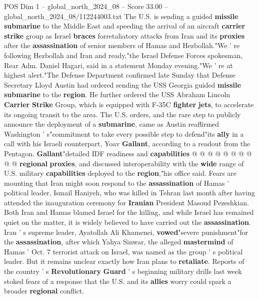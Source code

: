 \begin{textsample}{POS Dim 1 – global\_north\_2024\_08 – Score 33.00 – global\_north\_2024\_08/112244003.txt}  \label{ex:f1_pos_071}
The U.S. is sending a guided \textbf{missile} \textbf{submarine} to the Middle East and speeding the arrival of an aircraft \textbf{carrier} \textbf{strike} group as Israel \textbf{braces} forretaliatory attacks from Iran and its \textbf{proxies} after the \textbf{assassination} of senior members of Hamas and Hezbollah."We ' re following Hezbollah and Iran and ready,"the Israel Defense Forces spokesman, Rear Adm.
Daniel Hagari, said in a statement Monday evening."We ' re at highest alert."The Defense Department confirmed late Sunday that Defense Secretary Lloyd Austin had ordered sending the USS Georgia guided \textbf{missile} \textbf{submarine} to the \textbf{region}.
He further ordered the USS Abraham Lincoln \textbf{Carrier} \textbf{Strike} Group, which is equipped with F-35C \textbf{fighter} \textbf{jets}, to accelerate its ongoing transit to the area.
The U.S. orders, and the rare step to publicly announce the deployment of a \textbf{submarine}, came as Austin reaffirmed Washington ' s"commitment to take every possible step to defend"its \textbf{ally} in a call with his Israeli counterpart, Yoav \textbf{Gallant}, according to a readout from the Pentagon. \textbf{Gallant}"detailed IDF readiness and \textbf{capabilities} @ @ @ @ @ @ @ @ @ @ \textbf{regional} \textbf{proxies}, and discussed interoperability with the \textbf{wide} range of U.S. military \textbf{capabilities} deployed to the \textbf{region},"his office said.
Fears are mounting that Iran might soon respond to the \textbf{assassination} of Hamas ' political leader, Ismail Haniyeh, who was killed in Tehran last month after having attended the inauguration ceremony for \textbf{Iranian} President Masoud Pezeshkian.
Both Iran and Hamas blamed Israel for the killing, and while Israel has remained quiet on the matter, it is widely believed to have carried out the \textbf{assassination}.
Iran ' s supreme leader, Ayatollah Ali Khamenei, \textbf{vowed}"severe punishment"for the \textbf{assassination}, after which Yahya Sinwar, the alleged \textbf{mastermind} of Hamas ' Oct. 7 terrorist attack on Israel, was named as the group ' s political leader.
But it remains unclear exactly how Iran plans to \textbf{retaliate}.
Reports of the country ' s \textbf{Revolutionary} \textbf{Guard} ' s beginning military drills last week stoked fears of a response that the U.S. and its \textbf{allies} worry could spark a broader \textbf{regional} conflict.

\end{textsample}
